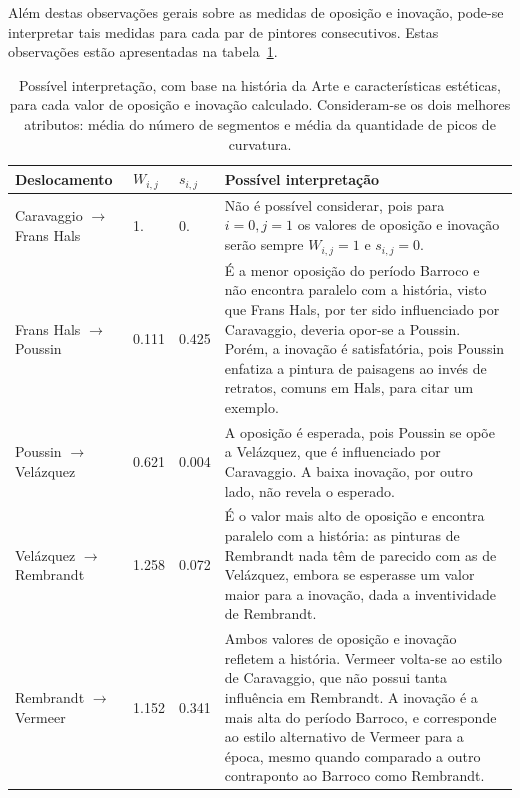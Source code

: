 \clearpage

Além destas observações gerais sobre as medidas de oposição e
inovação, pode-se interpretar tais medidas para cada par de pintores
consecutivos. Estas observações estão apresentadas na
tabela~\ref{tab:interpretacaoOpos}.

\begin{longtable}{lllp{7cm}}
\caption{\label{tab:interpretacaoOpos} Possível interpretação, com base na história da Arte e características estéticas, para cada valor de oposição e inovação calculado. Consideram-se os dois melhores atributos: média do número de segmentos e média da quantidade de picos de curvatura.}\\

\hline \hline
\textbf{Deslocamento}       & \textbf{$W_{i,j}$} & \textbf{$s_{i,j}$} & \textbf{Possível interpretação} \\ \hline

Caravaggio $\to$ Frans Hals & 1.  & 0.  & Não é possível considerar,
pois para $i=0,j=1$ os valores de oposição e inovação serão sempre
$W_{i,j}=1$ e $s_{i,j}=0$. \\ \hline

Frans Hals $\to$ Poussin    & 0.111              & 0.425              & É a menor oposição do período Barroco e não encontra paralelo com a história, visto que Frans Hals, por ter sido influenciado por Caravaggio, deveria opor-se a Poussin. Porém, a  inovação é satisfatória, pois Poussin enfatiza a pintura de paisagens ao invés de retratos, comuns em Hals, para citar um exemplo. \\ \hline

Poussin $\to$ Velázquez     & 0.621              & 0.004              & A oposição é esperada, pois Poussin se opõe a Velázquez, que é influenciado por Caravaggio. A baixa inovação, por outro lado, não revela o esperado. \\ \hline

Velázquez $\to$ Rembrandt   & 1.258              & 0.072              & É o valor mais alto de oposição e encontra paralelo com a história: as pinturas de Rembrandt nada têm de parecido com as de Velázquez, embora se esperasse um valor maior para a inovação, dada a inventividade de Rembrandt. \\ \hline

Rembrandt $\to$ Vermeer     & 1.152              & 0.341              & Ambos valores de oposição e inovação refletem a história. Vermeer volta-se ao estilo de Caravaggio, que não possui tanta influência em Rembrandt. A inovação é a mais alta do período Barroco, e corresponde ao estilo alternativo de Vermeer para a época, mesmo quando comparado a outro contraponto ao Barroco como Rembrandt. \\ \hline


\end{longtable}
